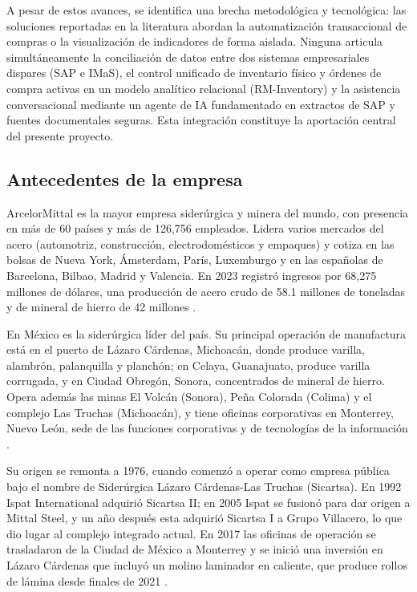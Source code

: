 A pesar de estos avances, se identifica una brecha metodológica y tecnológica: las soluciones reportadas en la literatura abordan la automatización transaccional de compras o la visualización de indicadores de forma aislada. Ninguna articula simultáneamente la conciliación de datos entre dos sistemas empresariales dispares (SAP e IMaS), el control unificado de inventario físico y órdenes de compra activas en un modelo analítico relacional (RM-Inventory) y la asistencia conversacional mediante un agente de IA fundamentado en extractos de SAP y fuentes documentales seguras. Esta integración constituye la aportación central del presente proyecto.

\subsection{Antecedentes de la empresa} \label{sec:antecedentes_empresa} %

ArcelorMittal es la mayor empresa siderúrgica y minera del mundo, con presencia en más de 60 países y más de 126,756 empleados. Lidera varios mercados del acero (automotriz, construcción, electrodomésticos y empaques) y cotiza en las bolsas de Nueva York, Ámsterdam, París, Luxemburgo y en las españolas de Barcelona, Bilbao, Madrid y Valencia. En 2023 registró ingresos por 68,275 millones de dólares, una producción de acero crudo de 58.1 millones de toneladas y de mineral de hierro de 42 millones \cite{arcelormittal2026mexico}.
 
En México es la siderúrgica líder del país. Su principal operación de manufactura está en el puerto de Lázaro Cárdenas, Michoacán, donde produce varilla, alambrón, palanquilla y planchón; en Celaya, Guanajuato, produce varilla corrugada, y en Ciudad Obregón, Sonora, concentrados de mineral de hierro. Opera además las minas El Volcán (Sonora), Peña Colorada (Colima) y el complejo Las Truchas (Michoacán), y tiene oficinas corporativas en Monterrey, Nuevo León, sede de las funciones corporativas y de tecnologías de la información \cite{arcelormittal2026mexico}.
 
Su origen se remonta a 1976, cuando comenzó a operar como empresa pública bajo el nombre de Siderúrgica Lázaro Cárdenas-Las Truchas (Sicartsa). En 1992 Ispat International adquirió Sicartsa II; en 2005 Ispat se fusionó para dar origen a Mittal Steel, y un año después esta adquirió Sicartsa I a Grupo Villacero, lo que dio lugar al complejo integrado actual. En 2017 las oficinas de operación se trasladaron de la Ciudad de México a Monterrey y se inició una inversión en Lázaro Cárdenas que incluyó un molino laminador en caliente, que produce rollos de lámina desde finales de 2021 \cite{arcelormittal2026mexico}.
 
